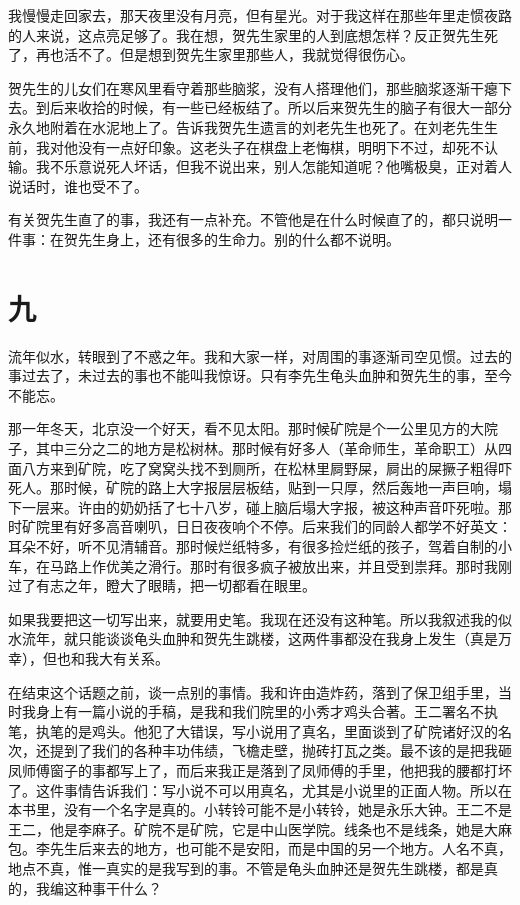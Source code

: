 我慢慢走回家去，那天夜里没有月亮，但有星光。对于我这样在那些年里走惯夜路的人来说，这点亮足够了。我在想，贺先生家里的人到底想怎样？反正贺先生死了，再也活不了。但是想到贺先生家里那些人，我就觉得很伤心。 

贺先生的儿女们在寒风里看守着那些脑浆，没有人搭理他们，那些脑浆逐渐干瘪下去。到后来收拾的时候，有一些已经板结了。所以后来贺先生的脑子有很大一部分永久地附着在水泥地上了。告诉我贺先生遗言的刘老先生也死了。在刘老先生生前，我对他没有一点好印象。这老头子在棋盘上老悔棋，明明下不过，却死不认输。我不乐意说死人坏话，但我不说出来，别人怎能知道呢？他嘴极臭，正对着人说话时，谁也受不了。 

有关贺先生直了的事，我还有一点补充。不管他是在什么时候直了的，都只说明一件事：在贺先生身上，还有很多的生命力。别的什么都不说明。

\section{九}

流年似水，转眼到了不惑之年。我和大家一样，对周围的事逐渐司空见惯。过去的事过去了，未过去的事也不能叫我惊讶。只有李先生龟头血肿和贺先生的事，至今不能忘。 


那一年冬天，北京没一个好天，看不见太阳。那时候矿院是个一公里见方的大院子，其中三分之二的地方是松树林。那时候有好多人（革命师生，革命职工）从四面八方来到矿院，吃了窝窝头找不到厕所，在松林里屙野屎，屙出的屎撅子粗得吓死人。那时候，矿院的路上大字报层层板结，贴到一只厚，然后轰地一声巨响，塌下一层来。许由的奶奶括了七十八岁，碰上脑后塌大字报，被这种声音吓死啦。那时矿院里有好多高音喇叭，日日夜夜响个不停。后来我们的同龄人都学不好英文：耳朵不好，听不见清辅音。那时候烂纸特多，有很多捡烂纸的孩子，驾着自制的小车，在马路上作优美之滑行。那时有很多疯子被放出来，并且受到祟拜。那时我刚过了有志之年，瞪大了眼睛，把一切都看在眼里。 

如果我要把这一切写出来，就要用史笔。我现在还没有这种笔。所以我叙述我的似水流年，就只能谈谈龟头血肿和贺先生跳楼，这两件事都没在我身上发生（真是万幸），但也和我大有关系。 

在结束这个话题之前，谈一点别的事情。我和许由造炸药，落到了保卫组手里，当时我身上有一篇小说的手稿，是我和我们院里的小秀才鸡头合著。王二署名不执笔，执笔的是鸡头。他犯了大错误，写小说用了真名，里面谈到了矿院诸好汉的名次，还提到了我们的各种丰功伟绩，飞檐走壁，抛砖打瓦之类。最不该的是把我砸凤师傅窗子的事都写上了，而后来我正是落到了凤师傅的手里，他把我的腰都打坏了。这件事情告诉我们：写小说不可以用真名，尤其是小说里的正面人物。所以在本书里，没有一个名字是真的。小转铃可能不是小转铃，她是永乐大钟。王二不是王二，他是李麻子。矿院不是矿院，它是中山医学院。线条也不是线条，她是大麻包。李先生后来去的地方，也可能不是安阳，而是中国的另一个地方。人名不真，地点不真，惟一真实的是我写到的事。不管是龟头血肿还是贺先生跳楼，都是真的，我编这种事干什么？

